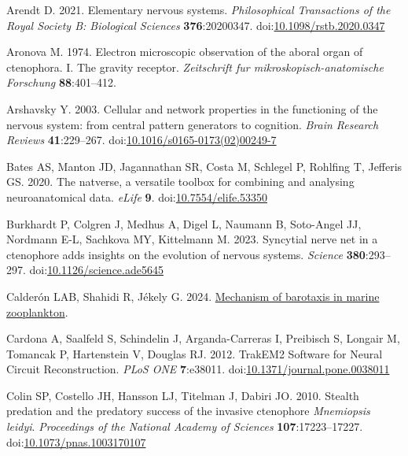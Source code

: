 \documentclass[
  11pt,
]{article}
\newlength{\cslhangindent}
\newenvironment{CSLReferences}[2] %
 {\begin{list}{}{%
  \setlength{\itemindent}{0pt}
  \setlength{\leftmargin}{0pt}
  \setlength{\parsep}{0pt}
  \ifodd #1
   \setlength{\leftmargin}{\cslhangindent}
   \setlength{\itemindent}{-1\cslhangindent}
  \fi
  \setlength{\itemsep}{#2\baselineskip}}}
 {\end{list}}
\begin{document}
\label{refs}
\begin{CSLReferences}{1}{0}
Arendt D. 2021. Elementary nervous systems. \emph{Philosophical
Transactions of the Royal Society B: Biological Sciences}
\textbf{376}:20200347.
doi:\href{https://doi.org/10.1098/rstb.2020.0347}{10.1098/rstb.2020.0347}

Aronova M. 1974. Electron microscopic observation of the aboral organ of
ctenophora. I. The gravity receptor. \emph{Zeitschrift fur
mikroskopisch-anatomische Forschung} \textbf{88}:401--412.

Arshavsky Y. 2003. Cellular and network properties in the functioning of
the nervous system: from central pattern generators to cognition.
\emph{Brain Research Reviews} \textbf{41}:229--267.
doi:\href{https://doi.org/10.1016/s0165-0173(02)00249-7}{10.1016/s0165-0173(02)00249-7}

Bates AS, Manton JD, Jagannathan SR, Costa M, Schlegel P, Rohlfing T,
Jefferis GS. 2020. The natverse, a versatile toolbox for combining and
analysing neuroanatomical data. \emph{eLife} \textbf{9}.
doi:\href{https://doi.org/10.7554/elife.53350}{10.7554/elife.53350}

Burkhardt P, Colgren J, Medhus A, Digel L, Naumann B, Soto-Angel JJ,
Nordmann E-L, Sachkova MY, Kittelmann M. 2023. Syncytial nerve net in a
ctenophore adds insights on the evolution of nervous systems.
\emph{Science} \textbf{380}:293--297.
doi:\href{https://doi.org/10.1126/science.ade5645}{10.1126/science.ade5645}

Calderón LAB, Shahidi R, Jékely G. 2024.
\href{http://dx.doi.org/10.7554/eLife.94306.2}{Mechanism of barotaxis in
marine zooplankton}.

Cardona A, Saalfeld S, Schindelin J, Arganda-Carreras I, Preibisch S,
Longair M, Tomancak P, Hartenstein V, Douglas RJ. 2012. TrakEM2 Software
for Neural Circuit Reconstruction. \emph{PLoS ONE} \textbf{7}:e38011.
doi:\href{https://doi.org/10.1371/journal.pone.0038011}{10.1371/journal.pone.0038011}

Colin SP, Costello JH, Hansson LJ, Titelman J, Dabiri JO. 2010. Stealth
predation and the predatory success of the invasive ctenophore
{\emph{Mnemiopsis leidyi}}. \emph{Proceedings of the National Academy of
Sciences} \textbf{107}:17223--17227.
doi:\href{https://doi.org/10.1073/pnas.1003170107}{10.1073/pnas.1003170107}


\end{CSLReferences}
\end{document}
